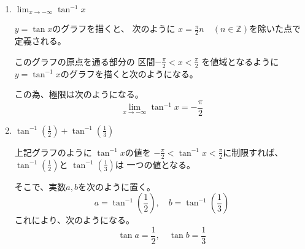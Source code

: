 \documentclass[12pt,b5paper]{ltjsarticle}
\begin{document}
\begin{enumerate}
\begin{enumerate}
       \item
            $\displaystyle \lim_{x\to -\infty} \tan^{-1}{x}$

            \dotfill

            $y=\tan{x}$のグラフを描くと、
            次のように
            $x=\frac{\pi}{2}n \quad (n\in\mathbb{Z})$を除いた点で
            定義される。


            このグラフの原点を通る部分の
            区間$-\frac{\pi}{2} < x < \frac{\pi}{2}$
            を値域となるように
            $y=\tan^{-1}{x}$のグラフを描くと次のようになる。


            この為、極限は次のようになる。
            \begin{equation}
             \lim_{x\to -\infty} \tan^{-1}{x}
              = -\frac{\pi}{2}
            \end{equation}

            \hrulefill

       \item
            $\displaystyle \tan^{-1}{\left(\frac{1}{2}\right)} + \tan^{-1}{\left(\frac{1}{3}\right)}$

            \dotfill

            上記グラフのように
            $\tan^{-1}{x}$の値を
            $-\frac{\pi}{2} < \tan^{-1}{x} < \frac{\pi}{2}$に制限すれば、
            $\tan^{-1}{\left(\frac{1}{2}\right)}$と
            $\tan^{-1}{\left(\frac{1}{3}\right)}$は
            一つの値となる。

            そこで、実数$a,b$を次のように置く。
            \begin{equation}
             a= \tan^{-1}{\left(\frac{1}{2}\right)}
              ,\quad
              b= \tan^{-1}{\left(\frac{1}{3}\right)}
            \end{equation}
            これにより、次のようになる。
            \begin{equation}
             \tan{a}= \frac{1}{2}
              ,\quad
              \tan{b}= \frac{1}{3}
            \end{equation}


\end{enumerate}
\end{enumerate}
\end{document}

